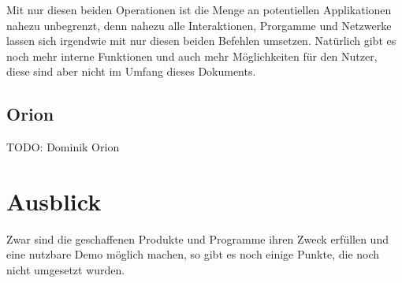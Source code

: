 \documentclass[11pt]{article}
\begin{document}
Mit nur diesen beiden Operationen ist die Menge an potentiellen
Applikationen nahezu unbegrenzt, denn nahezu alle Interaktionen,
Prorgamme und Netzwerke lassen sich irgendwie mit nur diesen beiden
Befehlen umsetzen. Natürlich gibt es noch mehr interne Funktionen und
auch mehr Möglichkeiten für den Nutzer, diese sind aber nicht im
Umfang dieses Dokuments.
\subsection{Orion}
\label{sec:orgf64b75d}
TODO: Dominik Orion
\section{Ausblick}
\label{sec:org15e19b0}
Zwar sind die geschaffenen Produkte und Programme ihren Zweck erfüllen
und eine nutzbare Demo möglich machen, so gibt es noch einige Punkte,
die noch nicht umgesetzt wurden.
\end{document}
